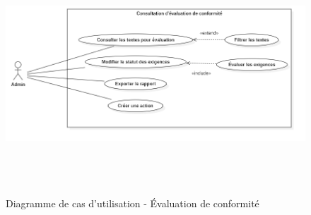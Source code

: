 \begin{figure}[H]
    \centering
    \includegraphics[width=13cm,height=9cm]{images/complianceuc.png}
    \caption{Diagramme de cas d'utilisation - Évaluation de conformité}
\end{figure}
\vspace{\baselineskip} 
